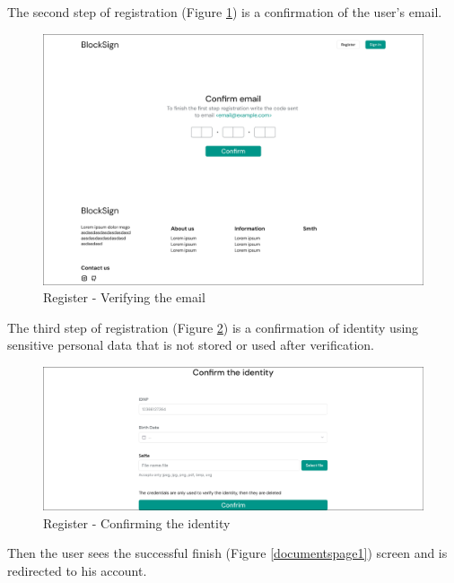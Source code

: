 \newpage
The second step of registration (Figure \ref{registerstep2}) is a confirmation of the user's email. 


\begin{figure}[H]
    \centering
    \includegraphics[width=18cm]{"images/figmaUI/registerstep2.png"}
    \caption{Register - Verifying the email}
    \label{registerstep2}
\end{figure}


The third step of registration (Figure \ref{registerstep3}) is a confirmation of identity using sensitive personal data that is not stored or used after verification.


\begin{figure}[H]
    \centering
    \includegraphics[width=18cm]{"images/figmaUI/register3-crop.png"}
    \caption{Register - Confirming the identity}
    \label{registerstep3}
\end{figure}

\newpage
Then the user sees the successful finish (Figure \ref{documentspage1}) screen and is redirected to his account.


